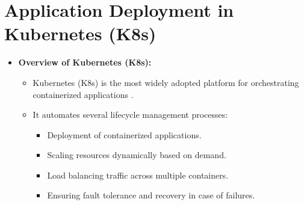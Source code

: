 \documentclass[conference]{IEEEtran}
\begin{document}
\section{Application Deployment in Kubernetes (K8s)}
\label{sec:application_deployment_k8s}
\begin{itemize}
    \item \textbf{Overview of Kubernetes (K8s):}
    \begin{itemize}
        \item Kubernetes (K8s) is the most widely adopted platform for orchestrating containerized applications \cite{burns2019kubernetes}.
        \item It automates several lifecycle management processes:
        \begin{itemize}
            \item Deployment of containerized applications.
            \item Scaling resources dynamically based on demand.
            \item Load balancing traffic across multiple containers.
            \item Ensuring fault tolerance and recovery in case of failures.
        \end{itemize}
    \end{itemize}
    

\end{itemize}
\end{document}
